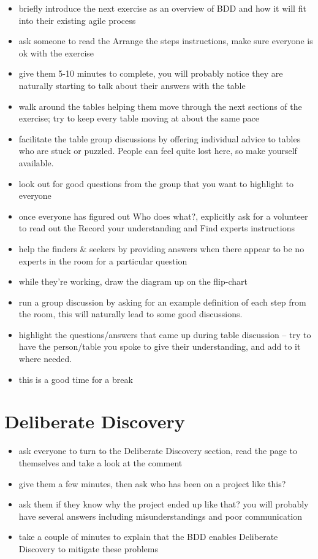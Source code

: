\begin{itemize}
    \item briefly introduce the next exercise as an overview of BDD and how it will fit into their existing agile process
    \item ask someone to read the Arrange the steps instructions, make sure everyone is ok with the exercise
    \item give them 5-10 minutes to complete, you will probably notice they are naturally starting to talk about their answers with the table
    \item walk around the tables helping them move through the next sections of the exercise; try to keep every table moving at about the same pace
    \item facilitate the table group discussions by offering individual advice to tables who are stuck or puzzled. People can feel quite lost here, so make yourself available.
    \item look out for good questions from the group that you want to highlight to everyone
    \item once everyone has figured out Who does what?, explicitly ask for a volunteer to read out the Record your understanding and Find experts instructions
    \item help the finders \& seekers by providing answers when there appear to be no experts in the room for a particular question
    \item while they're working, draw the diagram up on the flip-chart
    \item run a group discussion by asking for an example definition of each step from the room, this will naturally lead to some good discussions.
    \item highlight the questions/answers that came up during table discussion – try to have the person/table you spoke to give their understanding, and add to it where needed.
    \item this is a good time for a break
\end{itemize}

\section*{Deliberate Discovery}

\begin{itemize}
    \item ask everyone to turn to the Deliberate Discovery section, read the page to themselves and take a look at the comment
    \item give them a few minutes, then ask who has been on a project like this?
    \item ask them if they know why the project ended up like that? you will probably have several answers including misunderstandings and poor communication
    \item take a couple of minutes to explain that the BDD enables Deliberate Discovery to mitigate these problems
\end{itemize}


